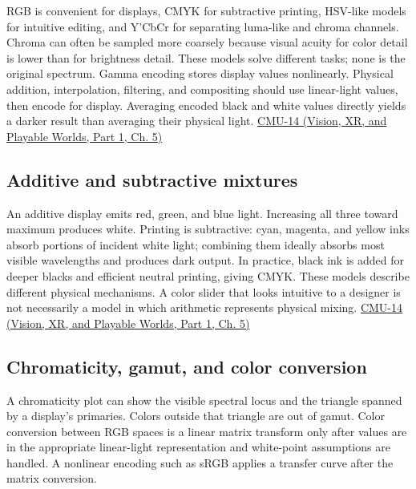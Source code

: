 RGB is convenient for displays, CMYK for subtractive printing, HSV-like models for intuitive editing, and Y'CbCr for separating luma-like and chroma channels. Chroma can often be sampled more coarsely because visual acuity for color detail is lower than for brightness detail. These models solve different tasks; none is the original spectrum. Gamma encoding stores display values nonlinearly. Physical addition, interpolation, filtering, and compositing should use linear-light values, then encode for display. Averaging encoded black and white values directly yields a darker result than averaging their physical light. \href{../07-Vision-XR-and-Playable-Worlds-P01/main.pdf\#nameddest=04-visual-computing-ii-ch036-cmu-14---color}{CMU-14 (Vision, XR, and Playable Worlds, Part 1, Ch. 5)}

\subsection{Additive and subtractive mixtures}\label{03-visual-computing-i-ch004-additive-and-subtractive-mixtures}

\hypertarget{03-visual-computing-i-ch004-additive-and-subtractive-mixtures}{}

An additive display emits red, green, and blue light. Increasing all three toward maximum produces white. Printing is subtractive: cyan, magenta, and yellow inks absorb portions of incident white light; combining them ideally absorbs most visible wavelengths and produces dark output. In practice, black ink is added for deeper blacks and efficient neutral printing, giving CMYK. These models describe different physical mechanisms. A color slider that looks intuitive to a designer is not necessarily a model in which arithmetic represents physical mixing. \href{../07-Vision-XR-and-Playable-Worlds-P01/main.pdf\#nameddest=04-visual-computing-ii-ch036-cmu-14---color}{CMU-14 (Vision, XR, and Playable Worlds, Part 1, Ch. 5)}

\subsection{Chromaticity, gamut, and color conversion}\label{03-visual-computing-i-ch004-chromaticity-gamut-and-color-conversion}

\hypertarget{03-visual-computing-i-ch004-chromaticity-gamut-and-color-conversion}{}

A chromaticity plot can show the visible spectral locus and the triangle spanned by a display's primaries. Colors outside that triangle are out of gamut. Color conversion between RGB spaces is a linear matrix transform only after values are in the appropriate linear-light representation and white-point assumptions are handled. A nonlinear encoding such as sRGB applies a transfer curve after the matrix conversion.

